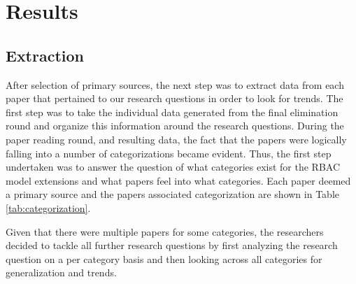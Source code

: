 \section{Results} \label{sec:results}

\subsection{Extraction}

After selection of primary sources, the next step was to extract data from each paper that pertained to our research questions in order to look for trends.  The first step was to take the individual data generated from the final elimination round and organize this information around the research questions.  During the paper reading round, and resulting data, the fact that the papers were logically falling into a number of categorizations became evident.  Thus, the first step undertaken was to answer the question of what categories exist for the RBAC model extensions and what papers feel into what categories.  Each paper deemed a primary source and the papers associated categorization are shown in Table \ref{tab:categorization}.

Given that there were multiple papers for some categories, the researchers decided to tackle all further research questions by first analyzing the research question on a per category basis and then looking across all categories for generalization and trends.

